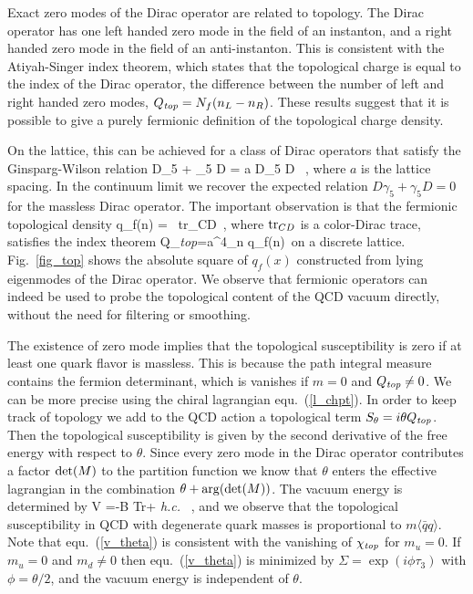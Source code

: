  Exact zero modes of the Dirac operator are related to topology. The 
Dirac operator has one left handed zero mode in the field of an instanton, 
and a right handed zero mode in the field of an anti-instanton. This 
is consistent with the Atiyah-Singer index theorem, which states that 
the topological charge is equal to the index of the Dirac operator, the 
difference between the number of left and right handed zero modes,
$Q_{\it top}=N_f(n_L-n_R)$. These results suggest that it is possible 
to give a purely fermionic definition of the topological charge density. 

 On the lattice, this can be achieved for a class of Dirac operators
that satisfy the Ginsparg-Wilson relation \cite{Ginsparg:1981bj}
\be 
 D\gamma_5 + \gamma_5 D = a D\gamma_5 D \, , 
\ee
where $a$ is the lattice spacing. In the continuum limit we recover
the expected relation $ D\gamma_5 + \gamma_5 D =0$ for the massless
Dirac operator. The important observation is that the fermionic 
topological density
\be 
\label{q_ferm}
q_f(n) = \, {\rm tr}_{CD} \, ,
\ee
where ${\rm tr}_{CD}$ is a color-Dirac trace, satisfies the index
theorem 
\be 
 Q_{\it top}=a^4\sum_n \; q_f(n)\,  
\ee
on a discrete lattice. 
Fig.~\ref{fig_top} shows the absolute square of $q_f(x)$ constructed 
from lying eigenmodes of the Dirac operator. We observe that 
fermionic operators can indeed be used to probe the topological content 
of the QCD vacuum directly, without the need for filtering or smoothing.

 The existence of zero mode implies that the topological susceptibility 
is zero if at least one quark flavor is massless. This is because the
path integral measure contains the fermion determinant, which is 
vanishes if $m=0$ and $Q_{\it top}\neq 0$. We can be more precise 
using the chiral lagrangian equ.~(\ref{l_chpt}). In order to keep 
track of topology we add to the QCD action a topological term 
$S_\theta = i\theta Q_{\it top}$. Then the topological susceptibility 
is given by the second derivative of the free energy with respect 
to $\theta$. Since every zero mode in the Dirac operator contributes 
a factor ${\rm det}(M)$ to the partition function we know that 
$\theta$ enters the effective lagrangian in the combination $\theta
+{\rm arg}(\det(M))$. The vacuum energy is determined by 
\be 
\label{v_theta}
 V =-B {\rm Tr} + {\it h.c.} \, , 
\ee
and we observe that the topological susceptibility in QCD with degenerate
quark masses is proportional to $m\langle\bar{q}q\rangle$. Note that 
equ.~(\ref{v_theta}) is consistent with the vanishing of $\chi_{\it top}$ 
for $m_u=0$. If $m_u=0$ and $m_d\neq 0$ then equ.~(\ref{v_theta}) is 
minimized by $\Sigma=\exp(i\phi\tau_3)$ with $\phi=\theta/2$, and the 
vacuum energy is independent of $\theta$.   

